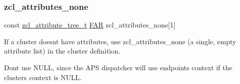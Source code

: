 \subsubsection{\texorpdfstring{zcl\+\_\+attributes\+\_\+none}{zcl\_attributes\_none}\hspace{0.1cm}{\footnotesize\ttfamily [2/2]}}
{\footnotesize\ttfamily const \hyperlink{structzcl__attribute__tree__t}{zcl\+\_\+attribute\+\_\+tree\+\_\+t} \hyperlink{group__hal_gaef060b3456fdcc093a7210a762d5f2ed}{F\+AR} zcl\+\_\+attributes\+\_\+none\mbox{[}1\mbox{]}}



If a cluster doesn\textquotesingle{}t have attributes, use zcl\+\_\+attributes\+\_\+none (a single, empty attribute list) in the cluster definition. 

Don\textquotesingle{}t use N\+U\+LL, since the A\+PS dispatcher will use endpoint\textquotesingle{}s context if the cluster\textquotesingle{}s context is N\+U\+LL. 